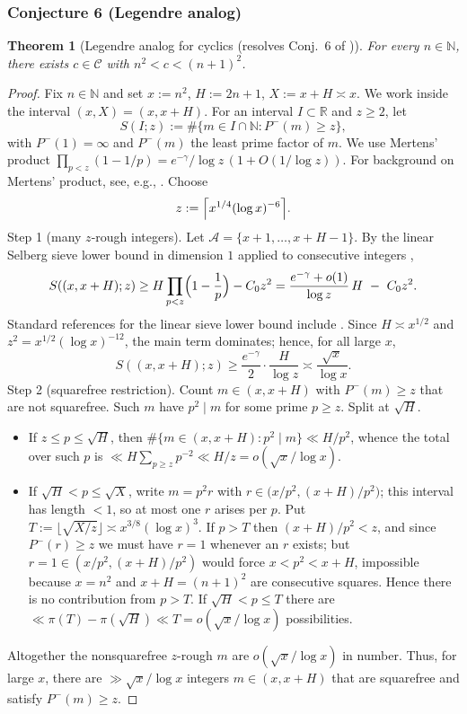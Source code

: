 \documentclass[12pt]{article}
\newtheorem{theorem}{Theorem}
\theoremstyle{remark}
\begin{document}
\subsubsection{Conjecture 6 (Legendre analog)}
\begin{theorem}[Legendre analog for cyclics (resolves Conj.~6 of \cite{Cohen2025})]\label{thm:legendre_cyclics}
For every \(n\in\mathbb{N}\), there exists \(c\in\mathcal{C}\) with \(n^2<c<(n+1)^2\).
\end{theorem}
\begin{proof}
Fix $n\in\mathbb N$ and set $x:=n^2$, $H:=2n+1$, $X:=x+H\asymp x$. We work inside the interval $(x,X)=(x,x+H)$. For an interval $I\subset\mathbb R$ and $z\ge2$, let
\[
S(I;z):=\#\{m\in I\cap\mathbb N: P^-(m)\ge z\},
\]
with $P^-(1)=\infty$ and $P^-(m)$ the least prime factor of $m$. We use Mertens' product $\prod_{p<z}(1-1/p)=e^{-\gamma}/\log z\,(1+O(1/\log z))$. For background on Mertens' product, see, e.g., \cite{Apostol1976}.
Choose
\[
z:=\Bigl\lceil x^{1/4}(\log x)^{-6}\Bigr\rceil.
\]
Step 1 (many $z$-rough integers). Let $\mathcal A=\{x+1,\dots,x+H-1\}$. By the linear Selberg sieve lower bound in dimension $1$ applied to consecutive integers \cite{HalRich1974,IK2004},
\[
S((x,x+H);z)\ge H\prod_{p<z}\Bigl(1-{1\over p}\Bigr)-C_0 z^2
=\frac{e^{-\gamma}+o(1)}{\log z}\,H\ -\ C_0 z^2.
\]
Standard references for the linear sieve lower bound include \cite{HalRich1974,IK2004}.
Since $H\asymp x^{1/2}$ and $z^2=x^{1/2}(\log x)^{-12}$, the main term dominates; hence, for all large $x$,
\[
S((x,x+H);z)\ge \frac{e^{-\gamma}}{2}\cdot\frac{H}{\log z}
\asymp \frac{\sqrt x}{\log x}.
\]
Step 2 (squarefree restriction). Count $m\in(x,x+H)$ with $P^-(m)\ge z$ that are not squarefree. Such $m$ have $p^2\mid m$ for some prime $p\ge z$. Split at $\sqrt H$.
\begin{itemize}
\item If $z\le p\le\sqrt H$, then $\#\{m\in(x,x+H): p^2\mid m\}\ll H/p^2$, whence the total over such $p$ is $\ll H\sum_{p\ge z}p^{-2}\ll H/z=o(\sqrt x/\log x)$.
\item If $\sqrt H<p\le\sqrt{X}$, write $m=p^2 r$ with $r\in\bigl(x/p^2,(x+H)/p^2\bigr)$; this interval has length $<1$, so at most one $r$ arises per $p$. Put $T:=\lfloor\sqrt{X/z}\rfloor\asymp x^{3/8}(\log x)^3$. If $p>T$ then $(x+H)/p^2<z$, and since $P^-(r)\ge z$ we must have $r=1$ whenever an $r$ exists; but $r=1\in(x/p^2,(x+H)/p^2)$ would force $x<p^2<x+H$, impossible because $x=n^2$ and $x+H=(n+1)^2$ are consecutive squares. Hence there is no contribution from $p>T$. If $\sqrt H<p\le T$ there are $\ll \pi(T)-\pi(\sqrt H)\ll T=o(\sqrt x/\log x)$ possibilities.
\end{itemize}
Altogether the nonsquarefree $z$-rough $m$ are $o(\sqrt x/\log x)$ in number.
Thus, for large $x$, there are $\gg \sqrt x/\log x$ integers $m\in(x,x+H)$ that are squarefree and satisfy $P^-(m)\ge z$.


\end{proof}
\end{document}
